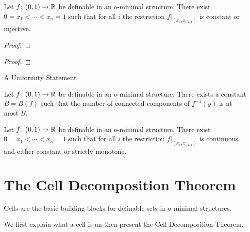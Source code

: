 \documentclass{beamer}
\begin{document}
\begin{frame}
  \begin{lemma}
    Let $f\colon (0,1)\rightarrow{\mathbb{R}}$ be definable in an o-minimal
    structure. There exist $0=x_1<\cdots <x_n =1$
    such that for all $i$ the restriction  $f|_{(x_i,x_{i+1})}$
    is constant or injective. 
  \end{lemma}
  \begin{proof}\renewcommand{\qedsymbol}{}
    \vspace{4.5cm}
  \end{proof}
\end{frame}

\begin{frame}
  \begin{proof}
    \vspace{7cm}
  \end{proof}
\end{frame}
\begin{frame}{A Uniformity Statement}
  \begin{corollary}
    Let  $f\colon (0,1)\rightarrow
    {\mathbb{R}}$ be definable in an o-minimal structure.
    There exists a constant $B=B(f)$ such that the number of connected
    components of $f^{-1}(y)$ is at most $B$. 
  \end{corollary}

  \begin{theorem}
    Let $f\colon (0,1)\rightarrow{\mathbb{R}}$ be definable in an o-minimal
    structure. There exist $0=x_1<\cdots <x_n =1$
    such that for all $i$ the restriction  $f|_{(x_i,x_{i+1})}$
    is continuous and either constant or strictly monotone.
  \end{theorem}
\end{frame}

\section{The Cell Decomposition Theorem}

\begin{frame}
  Cells are the basic building blocks for definable sets in o-minimal
  structures.

  We first explain what a cell is an then present the Cell
  Decomposition Theorem.
\end{frame}
\end{document}
